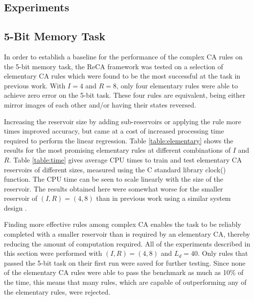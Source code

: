 \documentclass{elsarticle}
\begin{document}
\begin{multicols}{2}
	
	
	\section{Experiments}\label{experiment}
	\subsection{5-Bit Memory Task}
	In order to establish a baseline for the performance of the complex CA rules on 
	the 5-bit memory task, the ReCA framework was tested on a selection of 
	elementary CA rules which were found to be the most successful at the task 
	in previous work\cite{yilmaz2014reservoir}\cite{bye2016investigation}. With 
	$I = 4$ and $R = 8$, only four elementary rules were able to achieve zero 
	error on the 5-bit task. These four rules are equivalent, being either 
	mirror images of each other and/or having their states reversed.\par 
	Increasing the reservoir size by adding sub-reservoirs or applying the rule 
	more times improved accuracy, but came at a cost of increased processing 
	time required to perform the linear regression.  Table 
	\ref{table:elementary} shows the results for the most promising elementary 
	rules at different combinations of $I$ and $R$.  Table \ref{table:time} 
	gives average CPU times to train and test elementary CA reservoirs of different 
	sizes, measured using the C standard library clock() function. The CPU time 
	can be seen to scale linearly with the size of the reservoir. The results 
	obtained here were somewhat worse for the smaller reservoir of $(I,R) = 
	(4,8)$ than in previous work using a similar system design  
	\cite{yilmaz2014reservoir}\cite{bye2016investigation}\cite{nichele2017reservoir}.  
	\par Finding more effective rules among complex CA enables the task to be 
	reliably completed with a smaller reservoir than is required by an 
	elementary CA, thereby reducing the amount of computation required.  All of 
	the experiments described in this section were performed with $(I,R) = 
	(4,8)$ and $L_{d} = 40$.  Only rules that passed the 5-bit task on their 
	first run were saved for further testing.  Since none of the elementary CA 
	rules were able to pass the benchmark as much as 10\% of the time, this 
	means that many rules, which are capable of outperforming any of the 
	elementary rules, were rejected. 
	

\end{multicols}
\end{document}
